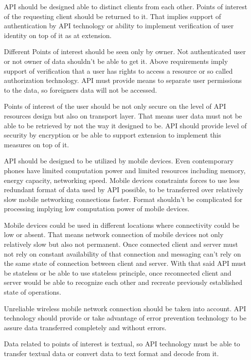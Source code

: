 \documentclass[thesis=M,english]{FITthesis}[2012/10/20]
\begin{document}
API should be designed able to distinct clients from each other. Points of interest of the requesting client should be returned to it. That implies support of authentication \cite{auth} by API technology or ability to implement verification of user identity on top of it as at extension.

Different Points of interest should be seen only by owner. Not authenticated user or not owner of data shouldn't  be able to get it.  Above requirements imply support of verification that a user has rights to access a resource or so called authorization \cite{auth} technology. API must provide means to separate user permissions to the data, so foreigners data will not be accessed.

Points of interest of the user should be not only secure on the level of API resources design but also on transport layer. That means user data must not be able to be retrieved by not the way it designed to be. API should provide level of security by encryption or be able to support extension to implement this measures on top of it.

API should be designed to be utilized by mobile devices. Even contemporary phones have limited computation power and limited resources including memory, energy capacity, networking speed. Mobile devices constraints forces to use less redundant format of data used by API possible, to be transferred over relatively slow mobile networking connections faster. Format shouldn't be complicated for processing implying low computation power of mobile devices. 

Mobile devices could be used in different locations where connectivity could be low or absent. That means network connection of mobile devices not only relatively slow but also not permanent. Once connected client and server must not rely on constant availability of that connection and messaging can’t rely on the same state of connection between client and server. With that said API must be stateless or be able to use stateless principle, once reconnected client and server would be able to recognize each other and recreate previously established state of operations.

Unreliable wireless mobile network connection should be taken into account. API technology should provide or take advantage of error prevention technology to be assure data transferred completely and without errors.

Data related to points of interest is textual, so API technology must be able to transfer textual data or convert data to text format and decode from it.
\end{document}
